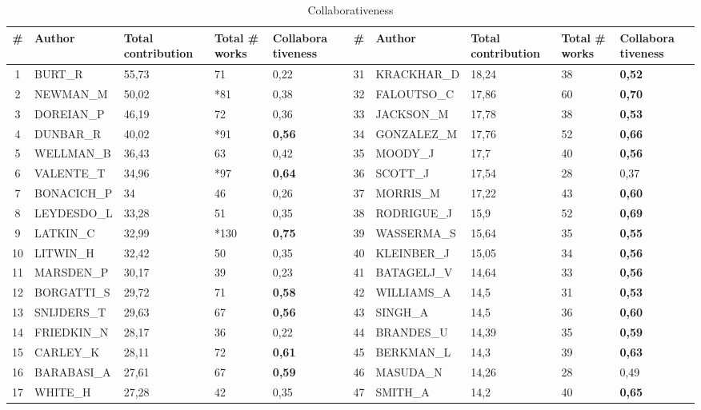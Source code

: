 \documentclass[11pt]{article} %
\begin{document}
\begin{table}
\caption{Collaborativeness} \label{collab}\medskip
\small
\renewcommand{\arraystretch}{0.95}
\small
\begin{tabular}{c|l|p{1cm}|p{1cm}|p{1.5cm}||c|l|p{1cm}|p{1cm}|p{1.5cm}|} 
\# & Author & Total contribution & Total \# works & Collabora tiveness & \# & Author & Total contribution & Total \# works & Collabora tiveness \\ \hline
1& 	BURT\_R& 	55,73& 	71& 	0,22& 		           31& 	KRACKHAR\_D& 	18,24& 	38& 	\textbf{0,52}\\
2& 	NEWMAN\_M& 	50,02& 	*81& 	0,38& 		32& 	FALOUTSO\_C& 	17,86& 	60& 	\textbf{0,70}\\
3& 	DOREIAN\_P& 	46,19& 	72& 	0,36& 		33& 	JACKSON\_M& 	17,78& 	38& 	\textbf{0,53}\\
4& 	DUNBAR\_R& 	40,02& 	*91& 	\textbf{0,56}&	34& 	GONZALEZ\_M& 	17,76& 	52& 	\textbf{0,66}\\
5& 	WELLMAN\_B& 	36,43& 	63& 	0,42&  		35& 	MOODY\_J& 	17,7& 	40& 	\textbf{0,56}\\
6& 	VALENTE\_T& 	34,96& 	*97& 	\textbf{0,64}&	36& 	SCOTT\_J& 	17,54& 	28& 	0,37\\
7& 	BONACICH\_P& 	34& 	46& 	0,26& 		37& 		MORRIS\_M& 	17,22& 	43& 	\textbf{0,60}\\
8& 	LEYDESDO\_L& 	33,28& 	51& 	0,35& 		38& 		RODRIGUE\_J & 	15,9& 	52& 	\textbf{0,69}\\
9& 	LATKIN\_C& 	32,99& 	*130& 	\textbf{0,75}& 	39& 	WASSERMA\_S& 	15,64& 	35& 	\textbf{0,55}\\
10& 	LITWIN\_H& 	32,42& 	50& 	0,35& 		40& 		KLEINBER\_J& 	15,05& 	34& 	\textbf{0,56}\\
11& 	MARSDEN\_P& 	30,17& 	39& 	0,23& 		41& 	BATAGELJ\_V& 	14,64& 	33& 	\textbf{0,56}\\
12& 	BORGATTI\_S& 	29,72& 	71& 	\textbf{0,58}& 	42& 	WILLIAMS\_A& 	14,5& 	31& 	\textbf{0,53}\\
13& 	SNIJDERS\_T& 	29,63& 	67& 	\textbf{0,56}& 	43& 	SINGH\_A& 	14,5& 	36& 	\textbf{0,60}\\
14& 	FRIEDKIN\_N& 	28,17& 	36& 	0,22& 		44& 	BRANDES\_U& 	14,39& 	35& 	\textbf{0,59}\\
15& 	CARLEY\_K& 	28,11& 	72& 	\textbf{0,61}& 	45& 	BERKMAN\_L& 	14,3& 	39& 	\textbf{0,63}\\
16& 	BARABASI\_A& 	27,61& 	67& 	\textbf{0,59}& 	46& 	MASUDA\_N& 	14,26& 	28& 	0,49\\
17& 	WHITE\_H& 	27,28& 	42& 	0,35& 		47& 		SMITH\_A& 	14,2& 	40& 	\textbf{0,65}\\

\end{tabular}
\end{table}
\end{document}
